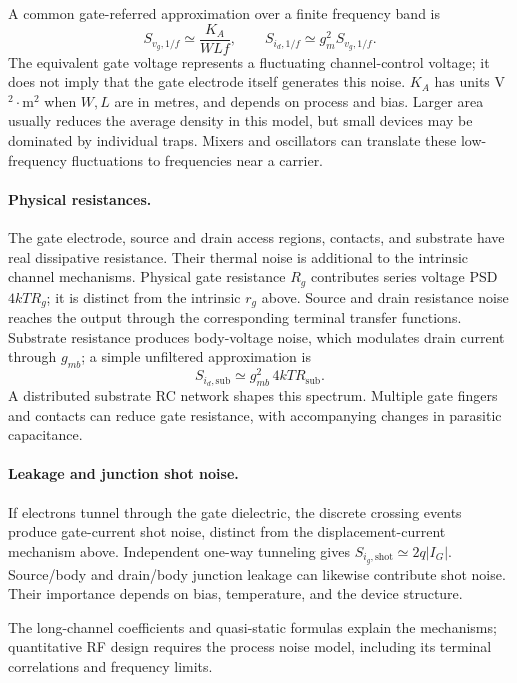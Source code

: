A common gate-referred approximation over a finite frequency band is
\[
S_{v_g,1/f}\simeq\frac{K_A}{WLf},\qquad
S_{i_d,1/f}\simeq g_m^2S_{v_g,1/f}.
\]
The equivalent gate voltage represents a fluctuating channel-control voltage; it does not imply that the gate electrode itself generates this noise. $K_A$ has units V$^2\cdot$m$^2$ when $W,L$ are in metres, and depends on process and bias. Larger area usually reduces the average density in this model, but small devices may be dominated by individual traps. Mixers and oscillators can translate these low-frequency fluctuations to frequencies near a carrier.

\paragraph{Physical resistances.}
The gate electrode, source and drain access regions, contacts, and substrate have real dissipative resistance. Their thermal noise is additional to the intrinsic channel mechanisms. Physical gate resistance $R_g$ contributes series voltage PSD $4kTR_g$; it is distinct from the intrinsic $r_g$ above. Source and drain resistance noise reaches the output through the corresponding terminal transfer functions. Substrate resistance produces body-voltage noise, which modulates drain current through $g_{mb}$; a simple unfiltered approximation is
\[
S_{i_d,\mathrm{sub}}\simeq g_{mb}^2\,4kTR_{\mathrm{sub}}.
\]
A distributed substrate RC network shapes this spectrum. Multiple gate fingers and contacts can reduce gate resistance, with accompanying changes in parasitic capacitance.

\paragraph{Leakage and junction shot noise.}
If electrons tunnel through the gate dielectric, the discrete crossing events produce gate-current shot noise, distinct from the displacement-current mechanism above. Independent one-way tunneling gives $S_{i_g,\mathrm{shot}}\simeq2q|I_G|$. Source/body and drain/body junction leakage can likewise contribute shot noise. Their importance depends on bias, temperature, and the device structure.

The long-channel coefficients and quasi-static formulas explain the mechanisms; quantitative RF design requires the process noise model, including its terminal correlations and frequency limits.
